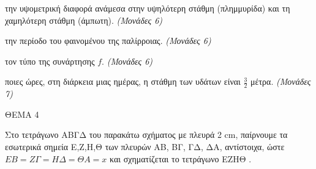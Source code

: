 \documentclass[11pt,a4paper,twoside]{book}
\newcommand{\monades}[1]{\hfill \textit{(Μονάδες #1)}}
\begin{document}
\begin{alist}
\item την υψομετρική διαφορά ανάμεσα στην υψηλότερη στάθμη (πλημμυρίδα) και τη χαμηλότερη στάθμη (άμπωτη).
\monades{6}

\item την περίοδο του φαινομένου της παλίρροιας.
\monades{6}

\item τον τύπο της συνάρτησης $f$.
\monades{6}

\item ποιες ώρες, στη διάρκεια μιας ημέρας, η στάθμη των υδάτων είναι $\frac{3}{2}$ μέτρα.
\monades{7}
\end{alist}

\vspace{4mm}

ΘΕΜΑ 4

Στο τετράγωνο ΑΒΓΔ του παρακάτω σχήματος με πλευρά 2 cm, παίρνουμε τα εσωτερικά σημεία Ε,Ζ,Η,Θ των πλευρών ΑΒ, ΒΓ, ΓΔ, ΔΑ, αντίστοιχα, ώστε $EB = Z\Gamma = H\Delta = \Theta A = x$ και σχηματίζεται το τετράγωνο ΕΖΗΘ .
\end{document}
